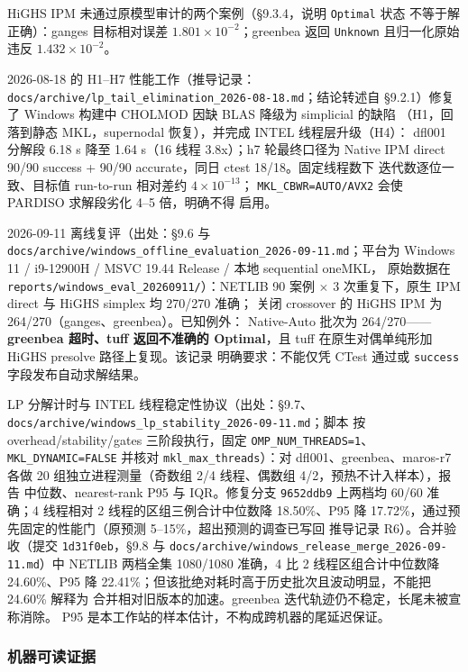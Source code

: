 HiGHS IPM 未通过原模型审计的两个案例（§9.3.4，说明 \texttt{Optimal} 状态
不等于解正确）：ganges 目标相对误差 $1.801\times10^{-2}$；greenbea 返回
\texttt{Unknown} 且归一化原始违反 $1.432\times10^{-2}$。

2026-08-18 的 H1--H7 性能工作（推导记录：
\texttt{docs/archive/lp\_tail\_elimination\_2026-08-18.md}；结论转述自
§9.2.1）修复了 Windows 构建中 CHOLMOD 因缺 BLAS 降级为 simplicial 的缺陷
（H1，回落到静态 MKL，supernodal 恢复），并完成 INTEL 线程层升级（H4）：
dfl001 分解段 6.18 s 降至 1.64 s（16 线程 3.8x）；h7 轮最终口径为 Native
IPM direct 90/90 success + 90/90 accurate，同日 ctest 18/18。固定线程数下
迭代数逐位一致、目标值 run-to-run 相对差约 $4\times10^{-13}$；
\texttt{MKL\_CBWR=AUTO/AVX2} 会使 PARDISO 求解段劣化 4--5 倍，明确不得
启用。

2026-09-11 离线复评（出处：§9.6 与
\texttt{docs/archive/windows\_offline\_evaluation\_2026-09-11.md}；平台为
Windows 11 / i9-12900H / MSVC 19.44 Release / 本地 sequential oneMKL，
原始数据在 \texttt{reports/windows\_eval\_20260911/}）：NETLIB 90 案例
$\times$ 3 次重复下，原生 IPM direct 与 HiGHS simplex 均 270/270 准确；
关闭 crossover 的 HiGHS IPM 为 264/270（ganges、greenbea）。已知例外：
Native-Auto 批次为 264/270——\textbf{greenbea 超时、tuff 返回不准确的
Optimal}，且 tuff 在原生对偶单纯形加 HiGHS presolve 路径上复现。该记录
明确要求：不能仅凭 CTest 通过或 \texttt{success} 字段发布自动求解结果。

LP 分解计时与 INTEL 线程稳定性协议（出处：§9.7、
\texttt{docs/archive/windows\_lp\_stability\_2026-09-11.md}；脚本
 按 overhead/stability/gates
三阶段执行，固定 \texttt{OMP\_NUM\_THREADS=1}、\texttt{MKL\_DYNAMIC=FALSE}
并核对 \texttt{mkl\_max\_threads}）：对 dfl001、greenbea、maros-r7 各做
20 组独立进程测量（奇数组 2/4 线程、偶数组 4/2，预热不计入样本），报告
中位数、nearest-rank P95 与 IQR。修复分支 \texttt{9652ddb9} 上两档均
60/60 准确；4 线程相对 2 线程的区组三例合计中位数降 18.50\%、P95 降
17.72\%，通过预先固定的性能门（原预测 5--15\%，超出预测的调查已写回
推导记录 R6）。合并验收（提交 \texttt{1d31f0eb}，§9.8 与
\texttt{docs/archive/windows\_release\_merge\_2026-09-11.md}）中 NETLIB
两档全集 1080/1080 准确，4 比 2 线程区组合计中位数降 24.60\%、P95 降
22.41\%；但该批绝对耗时高于历史批次且波动明显，不能把 24.60\% 解释为
合并相对旧版本的加速。greenbea 迭代轨迹仍不稳定，长尾未被宣称消除。
P95 是本工作站的样本估计，不构成跨机器的尾延迟保证。

\subsubsection{机器可读证据}

